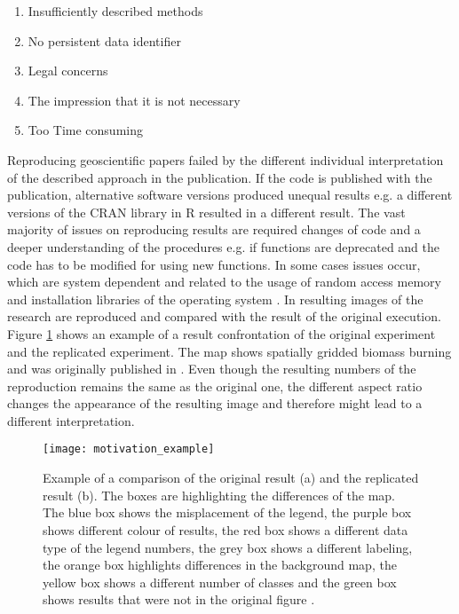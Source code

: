 \documentclass[draft,final]{vutinfth} %
\begin{document}
\begin{enumerate}
	\item Insufficiently described methods 
	\item No persistent data identifier
	\item Legal concerns
	\item The impression that it is not necessary
	\item Too Time consuming
\end{enumerate} 

Reproducing geoscientific papers failed by the different individual interpretation of the described approach in the publication. If the code is published with the publication, alternative software versions produced unequal results e.g. a different versions of the CRAN library in R resulted in a different result. The vast majority of issues on reproducing results are required changes of code and a deeper understanding of the procedures e.g. if functions are deprecated and the code has to be modified for using new functions. In some cases issues occur, which are system dependent and related to the usage of random access memory and installation libraries of the operating system \cite{Thestateofreproducibility}. In \cite{Thestateofreproducibility} resulting images of the research are reproduced and compared with the result of the original execution. Figure \ref{fig:motivation} shows an example of a result confrontation of the original experiment and the replicated experiment. The map shows spatially gridded biomass burning and was originally published  in \cite{bg-13-3225-2016}. Even though the resulting numbers of the reproduction remains the same as the original one, the different aspect ratio changes the appearance of the resulting image and therefore might lead to a different interpretation.

\begin{figure}[h]
	\centering
	\texttt{[image: motivation\_example]}
	\caption{Example of a comparison of the original result (a) and the replicated result (b). The boxes are highlighting the differences of the map. The blue box shows the misplacement of the legend, the purple box shows different colour of results, the red box shows a different data type of the legend numbers, the grey box shows a different labeling, the orange box highlights differences in the background map, the yellow box shows a different number of classes and the green box shows results that were not in the original figure \cite{Thestateofreproducibility}.}
	\label{fig:motivation} %
\end{figure} 
\end{document}
